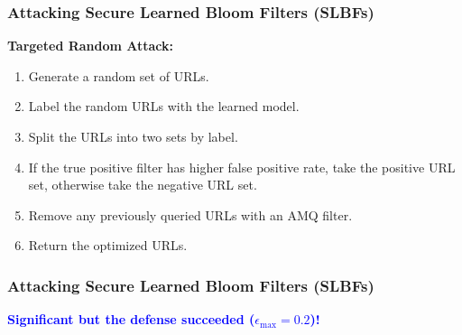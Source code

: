\documentclass{beamer}
\begin{document}

\begin{frame}
\frametitle{Attacking Secure Learned Bloom Filters (SLBFs)}

\textbf{Targeted Random Attack:}
\begin{enumerate}
    \item Generate a random set of URLs.
    \item Label the random URLs with the learned model.
    \item Split the URLs into two sets by label.
    \item If the true positive filter has higher false positive rate, take the positive URL set, otherwise take the negative URL set.
    \item Remove any previously queried URLs with an AMQ filter.
    \item Return the optimized URLs.
\end{enumerate}

\end{frame}


\begin{frame}
\frametitle{Attacking Secure Learned Bloom Filters (SLBFs)}

\begin{center}

    \textcolor{blue}{\textbf{Significant but the defense succeeded ($\epsilon_\text{max} = 0.2$)!}}
\end{center}

\end{frame}

\end{document}
